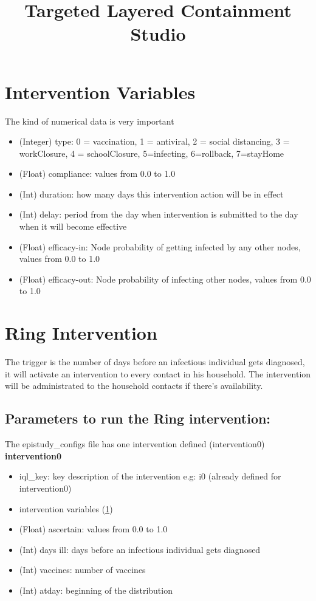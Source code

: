 \documentclass[11pt]{article}
\title{\bf Targeted Layered Containment Studio}
\author{}
\date{}
\begin{document}
\maketitle

\section{Intervention Variables}
\label{int:var}
The kind of numerical data is very important 
\begin{itemize}
\item (Integer) type: 0 = vaccination, 1 = antiviral, 2 = social distancing, 3 = workClosure, 4 = schoolClosure, 5=infecting, 6=rollback, 7=stayHome
\item (Float) compliance: values from 0.0 to 1.0
\item (Int) duration: how many days this intervention action will be in effect
\item (Int) delay: period from the day when intervention is submitted to the day when it will become effective
\item (Float) efficacy-in: Node probability of getting infected by any other nodes, values from  0.0 to 1.0
\item  (Float) efficacy-out: Node probability of infecting other nodes, values from  0.0 to 1.0
\end{itemize}

\section{Ring Intervention} 
The trigger is the number of days before an infectious individual gets diagnosed, it will activate an intervention to every contact in his household. The intervention will be administrated to the household contacts if there's availability.

\subsection{Parameters to run the Ring intervention:}
The epistudy\_configs file has one intervention defined (intervention0)\\
\textbf{intervention0}
\begin{itemize}
\item iql\_key: key description of the intervention e.g: i0 (already defined for intervention0)
\item intervention variables (\ref{int:var})
\item (Float) ascertain: values from 0.0 to 1.0
\item (Int) days ill: days before an infectious individual gets diagnosed 
\item (Int) vaccines: number of vaccines
\item (Int) atday: beginning of the distribution
\end{itemize}
\end{document}
